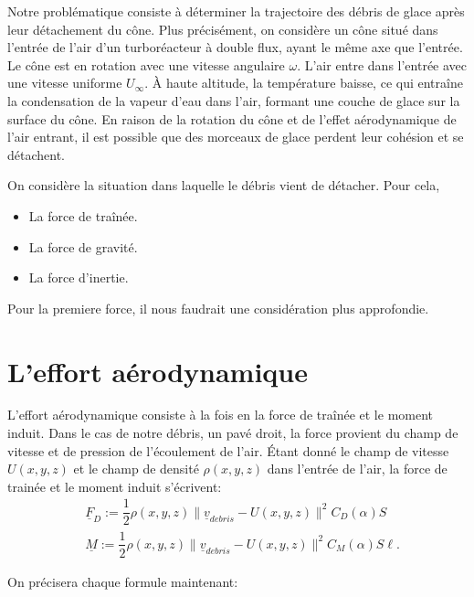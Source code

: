 \documentclass[12pt]{article}
\begin{document}
Notre problématique consiste à déterminer la trajectoire des débris de glace après leur détachement du cône. Plus précisément, on considère un cône situé dans l'entrée de l'air d’un turboréacteur à double flux, ayant le même axe que l’entrée. Le cône est en rotation avec une vitesse angulaire $\omega$. L'air entre dans l'entrée avec une vitesse uniforme $U_\infty$. À haute altitude, la température baisse, ce qui entraîne la condensation de la vapeur d'eau dans l'air, formant une couche de glace sur la surface du cône. En raison de la rotation du cône et de l'effet aérodynamique de l'air entrant, il est possible que des morceaux de glace perdent leur cohésion et se détachent.

On considère la situation dans laquelle le débris vient de détacher. Pour cela, 

\begin{itemize}
    \item La force de traînée.
    \item La force de gravité.
    \item La force d'inertie.
\end{itemize}

Pour la premiere force, il nous faudrait une considération plus approfondie. 

\section{L'effort aérodynamique} %

L'effort aérodynamique consiste à la fois en la force de traînée et le moment induit. Dans le cas de notre débris, un pavé droit, la force provient du champ de vitesse et de pression de l'écoulement de l'air. Étant donné le champ de vitesse $U(x, y, z)$ et le champ de densité $\rho(x, y, z)$ dans l'entrée de l'air, la force de trainée et le moment induit s'écrivent:
\begin{align}
    & \underline{F}_D := \dfrac{1}{2} \rho(x, y, z) \|\underline{v}_{debris} - U(x, y, z)\|^2 C_D(\alpha) S\\
    & \underline{M} := \dfrac{1}{2} \rho(x, y, z) \|\underline{v}_{debris} - U(x, y, z)\|^2 C_M(\alpha) S \ell.
\end{align}

On précisera chaque formule maintenant:



\end{document}
